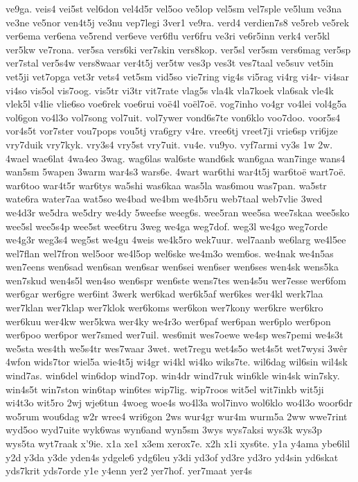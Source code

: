 {ve9ga.
veis4
vei5st
vel6don
vel4d5r
vel5oo
ve5lop
vel5sm
vel7sple
ve5lum
ve3na
ve3ne
ve5nor
ven4t5j
ve3nu
vep7legi
3ver1
ve9ra.
verd4
verdien7s8
ve5reb
ve5rek
ver6ema
ver6ena
ve5rend
ver6eve
ver6flu
ver6fru
ve3ri
ve6r5inn
verk4
ver5kl
ver5kw
ve7rona.
ver5sa
vers6ki
ver7skin
vers8kop.
ver5sl
ver5sm
vers6mag
ver5sp
ver7stal
ver5s4w
vers8waar
ver4t5j
ver5tw
ves3p
ves3t
ves7taal
ve5suv
vet5in
vet5ji
vet7opga
vet3r
vets4
vet5sm
vid5so
vie7ring
vig4s
vi5rag
vi4rg
vi4r-
vi4sar
vi4so
vis5ol
vis7oog.
vis5tr
vi3tr
vit7rate
vlag5s
vla4k
vla7koek
vla6sak
vle4k
vlek5l
v4lie
vlie6so
voe6rek
voe6rui
voë4l
voël7oë.
vog7inho
vo4gr
vo4lei
vol4g5a
vol6gon
vo4l3o
vol7song
vol7uit.
vol7ywer
vond6s7te
von6klo
voo7doo.
voor5s4
vor4s5t
vor7ster
vou7pops
vou5tj
vra6gry
v4re.
vree6tj
vreet7ji
vrie6sp
vri6jze
vry7duik
vry7kyk.
vry3s4
vry5st
vry7uit.
vu4e.
vu9yo.
vyf7armi
vy3s
1w
2w.
4wael
wae6lat
4wa4eo
3wag.
wag6las
wal6ste
wand6sk
wan6gaa
wan7inge
wans4
wan5sm
5wapen
3warm
war4s3
wars6e.
4wart
war6thi
war4t5j
war6toë
wart7oë.
war6too
war4t5r
war6tys
wa5shi
was6kaa
was5la
was6mou
was7pan.
wa5str
wate6ra
water7aa
wat5so
we4bad
we4bm
we4b5ru
web7taal
web7vlie
3wed
we4d3r
we5dra
we5dry
we4dy
5weefse
weeg6s.
wee5ran
wee5sa
wee7skaa
wee5sko
wee5sl
wee5s4p
wee5st
wee6tru
3weg
we4ga
weg7dof.
weg3l
we4go
weg7orde
we4g3r
weg3s4
weg5st
we4gu
4weis
we4k5ro
wek7uur.
wel7aanb
we6larg
we4l5ee
wel7flan
wel7fron
wel5oor
we4l5op
wel6ske
we4m3o
wem6os.
we4nak
we4n5as
wen7eens
wen6sad
wen6san
wen6sar
wen6sei
wen6ser
wen6ses
wen4sk
wens5ka
wen7skud
wen4s5l
wen4so
wen6spr
wen6ste
wens7tes
wen4s5u
wer7esse
wer6fom
wer6gar
wer6gre
wer6int
3werk
wer6kad
wer6k5af
wer6kes
wer4kl
werk7laa
wer7klan
wer7klap
wer7klok
wer6koms
wer6kon
wer7kony
wer6kre
wer6kro
wer6kuu
wer4kw
wer5kwa
wer4ky
we4r3o
wer6paf
wer6pan
wer6plo
wer6pon
wer6poo
wer6por
wer7smed
wer7uil.
wes6mit
wes7oewe
we4sp
wes7pemi
we4s3t
we5sta
wes4th
we5s4tr
wes7waar
3wet.
wet7regu
wet4s5o
wet4s5t
wet7wysi
3wêr
4wfon
wids7tor
wiel5a
wie4t5j
wi4gr
wi4kl
wi4ko
wiks7te.
wil6dag
wil6sin
wil4sk
wind7as.
win6del
win6dop
wind7op.
win4dr
wind7ruk
win6kle
win4sk
win7sky.
win4s5t
win7ston
win6tap
win6tes
wip7lig.
wip7roos
wit5el
wit7inkb
wit5ji
wi4t3o
wit5ro
2wj
wje6tun
4woeg
woe4s
wo4l3a
wol7invo
wol6klo
wo4l3o
woor6dr
wo5rum
wou6dag
w2r
wree4
wri6gon
2ws
wur4gr
wur4m
wurm5a
2ww
wwe7rint
wyd5oo
wyd7uite
wyk6was
wyn6and
wyn5sm
3wys
wys7aksi
wys3k
wys3p
wys5ta
wyt7raak
x'9ie.
x1a
xe1
x3em
xerox7e.
x2h
x1i
xys6te.
y1a
y4ama
ybe6lil
y2d
y3da
y3de
yden4s
ydgele6
ydg6leu
y3di
yd3of
yd3re
yd3ro
yd4sin
yd6skat
yds7krit
yds7orde
y1e
y4enn
yer2
yer7hof.
yer7maat
yer4s
}
